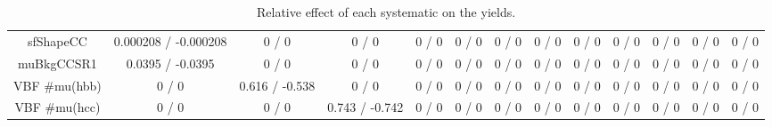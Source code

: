\documentclass[10pt]{article}
\begin{document}
\begin{table}[htbp]
\begin{center}
\begin{tabular}{|c|c|c|c|c|c|c|c|c|c|c|c|c|}
  sfShapeCC & 0.000208 / -0.000208 & 0 / 0 & 0 / 0 & 0 / 0 & 0 / 0 & 0 / 0 & 0 / 0 & 0 / 0 & 0 / 0 & 0 / 0 & 0 / 0 & 0 / 0 \\ 
  muBkgCCSR1 & 0.0395 / -0.0395 & 0 / 0 & 0 / 0 & 0 / 0 & 0 / 0 & 0 / 0 & 0 / 0 & 0 / 0 & 0 / 0 & 0 / 0 & 0 / 0 & 0 / 0 \\ 
  VBF #mu(hbb) & 0 / 0 & 0.616 / -0.538 & 0 / 0 & 0 / 0 & 0 / 0 & 0 / 0 & 0 / 0 & 0 / 0 & 0 / 0 & 0 / 0 & 0 / 0 & 0 / 0 \\ 
  VBF #mu(hcc) & 0 / 0 & 0 / 0 & 0.743 / -0.742 & 0 / 0 & 0 / 0 & 0 / 0 & 0 / 0 & 0 / 0 & 0 / 0 & 0 / 0 & 0 / 0 & 0 / 0 \\ 
\hline 
\end{tabular} 
\caption{Relative effect of each systematic on the yields.} 
\end{center} 
\end{table} 
\end{document}
